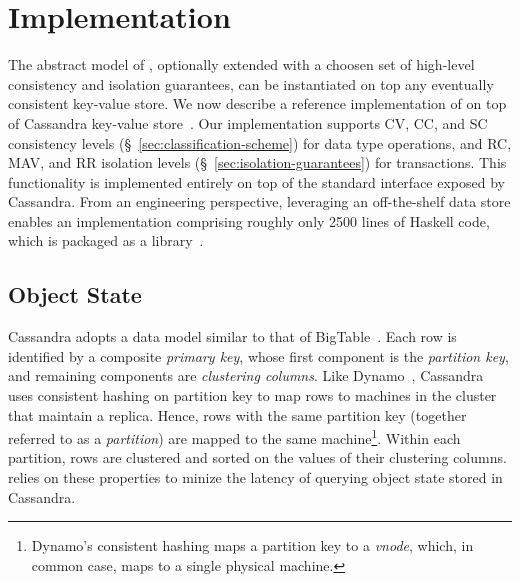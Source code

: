 \section{Implementation}
\label{sec:implementation}

The abstract model of \name, optionally extended with a choosen set of
high-level consistency and isolation guarantees, can be instantiated
on top any eventually consistent key-value store. We now describe a
reference implementation of \name on top of Cassandra key-value
store~\cite{Cassandra}. Our implementation supports CV, CC, and SC
consistency levels (\S~\ref{sec:classification-scheme}) for data type
operations, and RC, MAV, and RR isolation levels
(\S~\ref{sec:isolation-guarantees}) for transactions. This
functionality is implemented entirely on top of the standard interface
exposed by Cassandra. From an engineering perspective, leveraging an
off-the-shelf data store enables an implementation comprising roughly
only 2500 lines of Haskell code, which is packaged as a
library~\cite{QueleaHackage}.

\subsection{Object State}


Cassandra adopts a data model similar to that of
BigTable~\cite{BigTable}. Each row is identified by a composite
\emph{primary key}, whose first component is the \emph{partition key},
and remaining components are \emph{clustering columns}. Like
Dynamo~\cite{Dynamo}, Cassandra uses consistent hashing on partition
key to map rows to machines in the cluster that maintain a replica.
Hence, rows with the same partition key (together referred to as a
\emph{partition}) are mapped to the same machine\footnote{Dynamo's
consistent hashing maps a partition key to a \emph{vnode}, which, in
common case, maps to a single physical machine.}. Within each
partition, rows are clustered and sorted on the values of their
clustering columns. \name relies on these properties to minize the
latency of querying object state stored in Cassandra.

